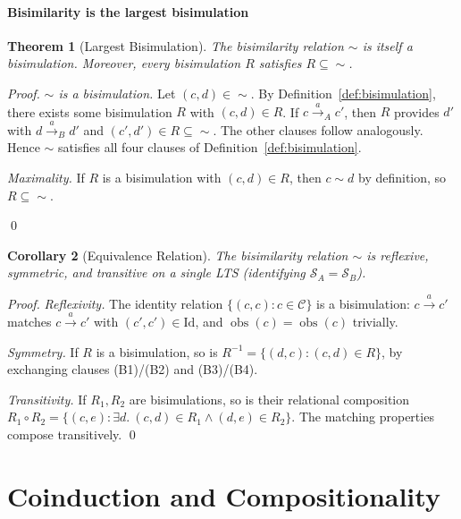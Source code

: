 \documentclass[twocolumn,11pt,a4paper]{article}
\newtheorem{theorem}{Theorem}[section]
\newtheorem{corollary}[theorem]{Corollary}
\DeclareMathOperator{\obs}{obs}
\newcommand{\Conf}{\mathcal{C}}
\newcommand{\Sys}{\mathcal{S}}
\newcommand{\bisim}{\sim}
\begin{document}
\subsection{Bisimilarity is the largest bisimulation}

\begin{theorem}[Largest Bisimulation]
\label{thm:largest}
The bisimilarity relation $\bisim$ is itself a bisimulation. Moreover, every bisimulation $R$ satisfies $R \subseteq \bisim$.
\end{theorem}

\begin{proof}
\emph{$\bisim$ is a bisimulation.} Let $(c, d) \in \bisim$. By Definition~\ref{def:bisimulation}, there exists some bisimulation $R$ with $(c, d) \in R$. If $c \xrightarrow{a}_A c'$, then $R$ provides $d'$ with $d \xrightarrow{a}_B d'$ and $(c', d') \in R \subseteq \bisim$. The other clauses follow analogously. Hence $\bisim$ satisfies all four clauses of Definition~\ref{def:bisimulation}.

\emph{Maximality.} If $R$ is a bisimulation with $(c, d) \in R$, then $c \bisim d$ by definition, so $R \subseteq \bisim$.

\qed
\end{proof}

\begin{corollary}[Equivalence Relation]
\label{cor:bisim-equiv}
The bisimilarity relation $\bisim$ is reflexive, symmetric, and transitive on a single LTS (identifying $\Sys_A = \Sys_B$).
\end{corollary}

\begin{proof}
\emph{Reflexivity.} The identity relation $\{(c, c) : c \in \Conf\}$ is a bisimulation: $c \xrightarrow{a} c'$ matches $c \xrightarrow{a} c'$ with $(c', c') \in \mathrm{Id}$, and $\obs(c) = \obs(c)$ trivially.

\emph{Symmetry.} If $R$ is a bisimulation, so is $R^{-1} = \{(d, c) : (c, d) \in R\}$, by exchanging clauses (B1)/(B2) and (B3)/(B4).

\emph{Transitivity.} If $R_1, R_2$ are bisimulations, so is their relational composition $R_1 \circ R_2 = \{(c, e) : \exists d.\ (c, d) \in R_1 \wedge (d, e) \in R_2\}$. The matching properties compose transitively. \qed
\end{proof}

\part{Coinduction and Compositionality}
\end{document}

